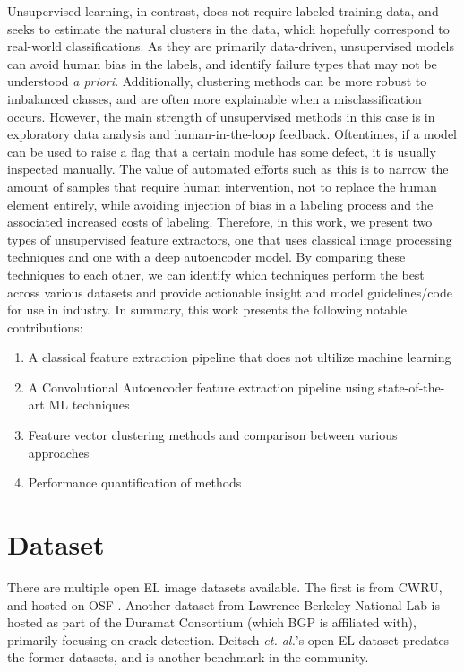 \documentclass[conference]{IEEEtran}
\begin{document}
Unsupervised learning, in contrast, does not require labeled training data, and seeks to estimate the natural clusters in the data, which hopefully correspond to real-world classifications. 
As they are primarily data-driven, unsupervised models can avoid human bias in the labels, and identify failure types that may not be understood \textit{a priori}. 
Additionally, clustering methods can be more robust to imbalanced classes, and are often more explainable when a misclassification occurs. 
However, the main strength of unsupervised methods in this case is in exploratory data analysis and human-in-the-loop feedback. 
Oftentimes, if a model can be used to raise a flag that a certain module has some defect, it is usually inspected manually. 
The value of automated efforts such as this is to narrow the amount of samples that require human intervention, not to replace the human element entirely, while avoiding injection of bias in a labeling process and the associated increased costs of labeling. 
Therefore, in this work, we present two types of unsupervised feature extractors, one that uses classical image processing techniques and one with a deep autoencoder model. 
By comparing these techniques to each other, we can identify which techniques perform the best across various datasets and provide actionable insight and model guidelines/code for use in industry. 
In summary, this work presents the following notable contributions:
\begin{enumerate}
    \item A classical feature extraction pipeline that does not ultilize machine learning
    \item A Convolutional Autoencoder feature extraction pipeline using state-of-the-art ML techniques
    \item Feature vector clustering methods and comparison between various approaches
    \item Performance quantification of methods
\end{enumerate}

\section{Dataset}
There are multiple open EL image datasets available. 
The first is from CWRU, and hosted on OSF \cite{noauthor_osf_nodate}. 
Another dataset \cite{chen_automated_2022} from Lawrence Berkeley National Lab is hosted as part of the Duramat Consortium (which BGP is affiliated with), primarily focusing on crack detection. 
Deitsch \textit{et. al.}'s open EL dataset \cite{deitsch_automatic_2019} predates the former datasets, and is another benchmark in the community. 
\end{document}
